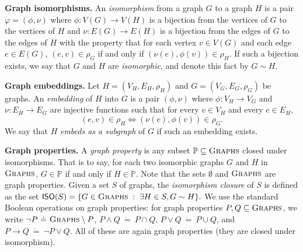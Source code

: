 \documentclass[11pt,a4paper]{article}
\newcommand{\agraph}{G}
\newcommand{\bgraph}{H}
\newcommand{\vertexset}[1]{V(#1)}
\newcommand{\edgeset}[1]{E(#1)}
\newcommand{\incidencerelationname}{\rho}
\newcommand{\incidencerelation}[1]{\incidencerelationname_{#1}}
\newcommand{\anedge}{e}
\newcommand{\avertex}{v}
\newcommand{\defeq}{~\dot{=}~}
\newcommand{\graphproperty}{\mathbb{P}}
\newcommand{\asetgraphs}{S}
\newcommand{\isomorphic}{\sim}
\newcommand{\isomorphism}{\varphi}
\newcommand{\isomorphismclosure}[1]{\mathsf{ISO}(#1)}
\newcommand{\allgraphs}{\textsc{Graphs}}
\newcommand{\isomorphismvertices}{\phi}
\newcommand{\isomorphismedges}{\nu}
\begin{document}
\par\medskip\noindent\textbf{Graph isomorphisms.}
An {\em isomorphism} from a graph $\agraph$ to a graph $\bgraph$ is a pair
$\isomorphism  = (\isomorphismvertices,\isomorphismedges)$ where
$\isomorphismvertices:\vertexset{\agraph}\rightarrow \vertexset{\bgraph}$ is a
bijection from the vertices of $\agraph$ to the vertices of $\bgraph$ and
$\isomorphismedges:\edgeset{\agraph}\rightarrow \edgeset{\bgraph}$ is a
bijection from the edges of $\agraph$ to the edges of $\bgraph$ with the
property that for each vertex $\avertex\in \vertexset{\agraph}$ and each edge
$\anedge \in \edgeset{\agraph}$, $(\anedge,\avertex)\in
\incidencerelation{\agraph}$ if and only if
$(\isomorphismedges(\anedge),\isomorphismvertices(\avertex))\in \incidencerelation{\bgraph}$.
If such a bijection exists, we say that $\agraph$
and $\bgraph$ are {\em isomorphic}, and denote this fact by $\agraph\sim \bgraph$.

\par\medskip\noindent\textbf{Graph embeddings.}
Let $H=(V_H,E_H,\incidencerelation{H})$ and $G=(V_G,E_G,\incidencerelation{G})$ be graphs.
An \emph{embedding} of $H$ into $G$ is a pair $(\phi,\nu)$ where $\phi:V_H\to V_G$ and $\nu:E_H\to E_G$ are injective functions such that for every $v\in V_H$ and every $e\in E_H$,
\[
(e,v)\in \incidencerelation{H} \iff (\nu(e),\phi(v))\in \incidencerelation{G}.
\]
We say that $H$ \emph{embeds as a subgraph} of $G$ if such an embedding exists.

\par\medskip\noindent\textbf{Graph properties.}
A {\em graph property} is any subset $\graphproperty \subseteq \allgraphs$
closed under isomorphisms. That is to say, for each two isomorphic graphs
$\agraph$ and $\bgraph$ in $\allgraphs$, $\agraph \in\graphproperty$ if and
only if $\bgraph\in\graphproperty$. Note that the sets $\emptyset$ and
$\allgraphs$ are graph properties. Given a set $\asetgraphs$ of graphs, the
{\em isomorphism closure} of $\asetgraphs$ is defined as the set
$\isomorphismclosure{\asetgraphs} = \{\agraph\in \allgraphs \;:\; \exists
\bgraph \in \asetgraphs, \agraph\isomorphic \bgraph\}.$
We use the standard Boolean operations on graph properties: for graph properties $P,Q\subseteq \allgraphs$, we write
$\neg P\defeq \allgraphs\setminus P$,
$P\wedge Q\defeq P\cap Q$,
$P\vee Q\defeq P\cup Q$,
and $P\rightarrow Q \defeq \neg P\vee Q$.
All of these are again graph properties (they are closed under isomorphism).
\end{document}
